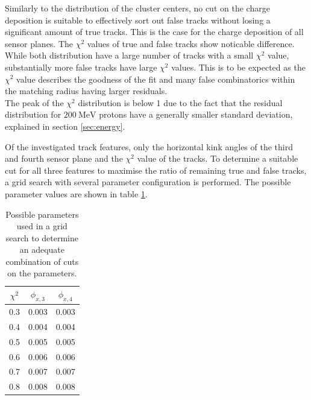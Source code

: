 Similarly to the distribution of the cluster centers, no cut on the charge deposition is suitable to effectively sort out false tracks without losing a significant
amount of true tracks. This is the case for the charge deposition of all sensor planes.
The $\chi^2$ values of true and false tracks show noticable difference. While both distribution have a large number of tracks
with a small $\chi^2$ value, substantially more false tracks have large $\chi^2$ values. This is to be expected as the $\chi^2$ value describes the goodness of the fit and
many false combinatorics within the matching radius having larger residuals. \\
The peak of the $\chi^2$ distribution is below 1 due to the fact that the residual distribution
for $\SI{200}{\mega\eV}$ protons have a generally smaller standard deviation, explained in section \ref{sec:energy}.

Of the investigated track features, only the horizontal kink angles of the third and fourth sensor plane and the $\chi^2$ value of the tracks. To determine a suitable
cut for all three features to maximise the ratio of remaining true and false tracks, a grid search with several parameter configuration is performed. The
possible parameter values are shown in table \ref{tab:params}.

\begin{table}
  \centering
  \begin{tabular}{c c c}
    \toprule
    $\chi^2$ & $\phi_{x,3}$ & $\phi_{x,4}$\\
    \midrule
    0.3 & 0.003 & 0.003 \\
    0.4 & 0.004 & 0.004 \\
    0.5 & 0.005 & 0.005 \\
    0.6 & 0.006 & 0.006 \\
    0.7 & 0.007 & 0.007 \\
    0.8 & 0.008 & 0.008
  \end{tabular}
  \caption{Possible parameters used in a grid search to determine an adequate combination of cuts on the parameters.}
  \label{tab:params}
\end{table}

